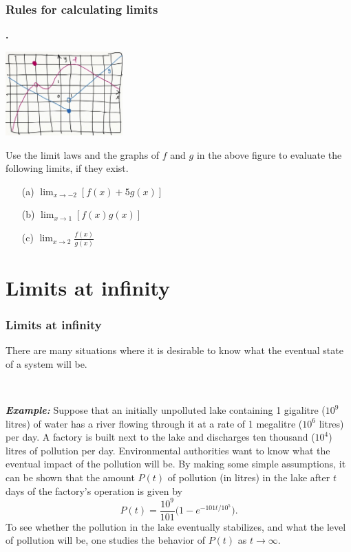\documentclass[t]{beamer}
\theoremstyle{plain}
\theoremstyle{definition}
\newcounter{heading}
\newcommand{\newhead}[1]{\medskip\stepcounter{heading}\noindent\textbf{\hspace{0.2cm}{#1}.}}
\newcommand{\limm}[1]{\displaystyle \lim_{x\to #1}}
\begin{document}
\frame
{
	\frametitle{Rules for calculating limits}


\newhead{Example}

\vspace*{-3mm}\begin{center}
\includegraphics[width=45mm]{Ch1limitsfigure.jpg}
\end{center}  
  
  \noindent Use the limit laws and the graphs of $f$ and $g$ in the above figure to evaluate the following limits, if they exist.
  \begin{enumerate}[<+->]
  \item[(a)] $\limm{-2}[f(x) + 5g(x)]$
  \item[(b)] $\limm{1}[f(x)g(x)]$
  \item[(c)] $\limm{2}\frac{f(x)}{g(x)}$
  \end{enumerate}

}


\section{Limits at infinity}
\begin{frame}
\frametitle{Limits at infinity}
\noindent There are many situations where it is desirable to know what the eventual state of a system will be.

\

\noindent\begin{small}
 \textit{\bf Example:} Suppose that an initially unpolluted lake containing 1 gigalitre ($10^{9}$ litres) of water has a river flowing through it at a rate of 1 megalitre ($10^{6}$ litres) per day. A factory is built next to the lake and discharges ten thousand ($10^{4}$) litres of pollution per day. Environmental authorities want to know what the eventual impact of the pollution will be.
 By making some simple assumptions, it can be shown that the amount $P(t)$ of pollution (in litres) in the lake after $t$ days of the factory's operation is given by
\begin{equation}\label{eq:pollution model}
P(t)=\frac{10^9}{101}\big(1-e^{-101t/10^5}\big).
\end{equation}
To see whether the pollution in the lake eventually stabilizes, and what the level of pollution will be, one studies the behavior of $P(t)$ as $t\to\infty$.
\end{small}
\end{frame}
\end{document}
